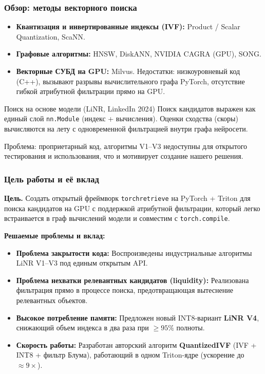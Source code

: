 \documentclass[aspectratio=169,9pt]{beamer}
\begin{document}
\begin{frame}
\frametitle{Обзор: методы векторного поиска}

\begin{itemize}
  \item \textbf{Квантизация и инвертированные индексы (IVF):} Product / Scalar Quantization, ScaNN.
  \item \textbf{Графовые алгоритмы:} HNSW, DiskANN, NVIDIA CAGRA (GPU), SONG.
  \item \textbf{Векторные СУБД на GPU:} Milvus. 
        \alert{Недостатки:} низкоуровневый код (C++), вызывают разрывы вычислительного графа PyTorch, отсутствие гибкой атрибутной фильтрации прямо на GPU.
\end{itemize}

\vspace{0.5em}
\begin{block}{Поиск на основе модели (LiNR, LinkedIn 2024)}
  Поиск кандидатов выражен как единый слой \texttt{nn.Module} (индекс + вычисления). Оценки сходства (скоры) вычисляются на лету с одновременной фильтрацией внутри графа нейросети.
  
  \alert{Проблема:} проприетарный код, алгоритмы V1--V3 недоступны для открытого тестирования и использования, что и мотивирует создание нашего решения.
\end{block}
\end{frame}

\begin{frame}
\frametitle{Цель работы и её вклад}

\textbf{Цель.} Создать открытый фреймворк \texttt{torchretrieve} на PyTorch + Triton для поиска кандидатов на GPU с поддержкой атрибутной фильтрации, который легко встраивается в граф вычислений модели и совместим с \texttt{torch.compile}.

\vspace{0.8em}
\textbf{Решаемые проблемы и вклад:}
\begin{itemize}
  \item \textbf{Проблема закрытости кода:} Воспроизведены индустриальные алгоритмы LiNR V1--V3 под единым открытым API.
  \item \textbf{Проблема нехватки релевантных кандидатов (liquidity):} Реализована фильтрация прямо в процессе поиска, предотвращающая вытеснение релевантных объектов.
  \item \textbf{Высокое потребление памяти:} Предложен новый INT8-вариант \textbf{LiNR V4}, снижающий объем индекса в два раза при $\ge 95\%$ полноты.
  \item \textbf{Скорость работы:} Разработан авторский алгоритм \textbf{QuantizedIVF} (IVF + INT8 + фильтр Блума), работающий в одном Triton-ядре (ускорение до ${\approx}9\times$).
\end{itemize}
\end{frame}
\end{document}
